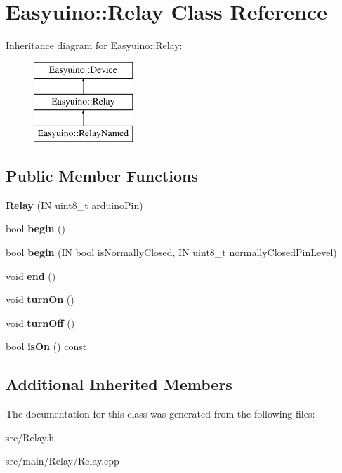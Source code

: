 \hypertarget{class_easyuino_1_1_relay}{}\section{Easyuino\+:\+:Relay Class Reference}
\label{class_easyuino_1_1_relay}
Inheritance diagram for Easyuino\+:\+:Relay\+:\begin{figure}[H]
\begin{center}
\leavevmode
\includegraphics[height=3.000000cm]{class_easyuino_1_1_relay}
\end{center}
\end{figure}
\subsection*{Public Member Functions}
\begin{DoxyCompactItemize}
\item 
\mbox{\label{class_easyuino_1_1_relay_a34a9e8461a4018e88ee49d956aca37f7}} 
{\bfseries Relay} (IN uint8\+\_\+t arduino\+Pin)
\item 
\mbox{\label{class_easyuino_1_1_relay_a920a0fa287cacfd8c6df19d8812d4958}} 
bool {\bfseries begin} ()
\item 
\mbox{\label{class_easyuino_1_1_relay_a05e66468ee1b991f394d9182b9886bf7}} 
bool {\bfseries begin} (IN bool is\+Normally\+Closed, IN uint8\+\_\+t normally\+Closed\+Pin\+Level)
\item 
\mbox{\label{class_easyuino_1_1_relay_a2b57237c996a6ffe8e900ae273bce9d4}} 
void {\bfseries end} ()
\item 
\mbox{\label{class_easyuino_1_1_relay_a28b594b3ee957e062630fa2c771a966d}} 
void {\bfseries turn\+On} ()
\item 
\mbox{\label{class_easyuino_1_1_relay_a9cab51ad0aaea32752df829f3f6b8113}} 
void {\bfseries turn\+Off} ()
\item 
\mbox{\label{class_easyuino_1_1_relay_af8b4ac99e27ffac6c5f8d69d36dc01f5}} 
bool {\bfseries is\+On} () const
\end{DoxyCompactItemize}
\subsection*{Additional Inherited Members}


The documentation for this class was generated from the following files\+:\begin{DoxyCompactItemize}
\item 
src/Relay.\+h\item 
src/main/\+Relay/Relay.\+cpp\end{DoxyCompactItemize}

